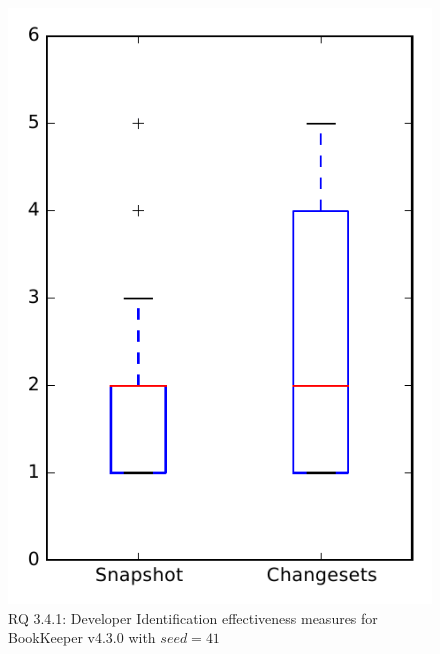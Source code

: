 
\begin{figure}
\centering
\includegraphics[height=0.4\textheight]{figures/dit_seed/rq1_bookkeeper_41}
\caption{RQ 3.4.1: Developer Identification effectiveness measures for BookKeeper v4.3.0 with $seed=41$}
\label{fig:dit_seed:rq1:bookkeeper}
\end{figure}
